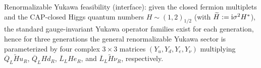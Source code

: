 \noindent Renormalizable Yukawa feasibility (interface): given the closed fermion multiplets and the CAP-closed Higgs quantum numbers $H\sim(1,2)_{1/2}$ (with $\widetilde H:=\mathrm{i}\sigma^2 H^\ast$), the standard gauge-invariant Yukawa operator families exist for each generation, hence for three generations the general renormalizable Yukawa sector is parameterized by four complex $3\times 3$ matrices $(Y_u,Y_d,Y_e,Y_\nu)$ multiplying $\overline Q_L\widetilde H u_R$, $\overline Q_L H d_R$, $\overline L_L H e_R$, and $\overline L_L\widetilde H\nu_R$, respectively.